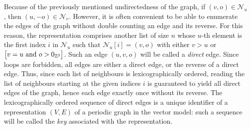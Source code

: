 \documentclass[main.tex]{subfiles}
\begin{document}
Because of the previously mentioned undirectedness of the graph, if $(v,o)\in \mathcal N_u$, then $(u,-o)\in \mathcal N_v$. However, it is often convenient to be able to enumerate the edges of the graph without double counting an edge and its reverse. For this reason, the representation comprises another list of size $n$ whose $u$-th element is the first index $i$ in $\mathcal N_u$ such that $\mathcal N_u[i] = (v,o)$ with either $v>u$ or $\big[ v = u\text{ and }o > 0_{\mathbb{Z}^3} \big]$. Such an edge $(u,v,o)$ will be called a \emph{direct} edge. Since loops are forbidden, all edges are either a direct edge, or the reverse of a direct edge. Thus, since each list of neighbours is lexicographically ordered, reading the list of neighbours starting at the given indices $i$ is guaranteed to yield all direct edges of the graph, hence each edge exactly once without its reverse. The lexicographically ordered sequence of direct edges is a unique identifier of a representation $(V,E)$ of a periodic graph in the vector model: such a sequence will be called the \emph{key} associated with the representation.
\end{document}
